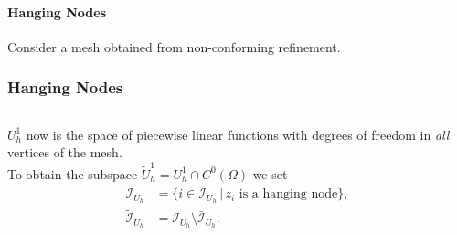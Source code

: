 \paragraph{Hanging Nodes}

Consider a mesh obtained from non-conforming refinement.

\begin{frame}
\frametitle<presentation>{Hanging Nodes}
\begin{columns}
\begin{column}{0.6\textwidth}
$U_h^1$ now is the space of piecewise linear functions with degrees of
freedom in \textit{all} vertices of the mesh. \\
\medskip
To obtain the subspace $\tilde{U}_h^1 = U_h^1 \cap C^0(\Omega)$ we set 
\begin{align*}
\bar{\mathcal{I}}_{U_h} &= \{i\in \mathcal{I}_{U_h} \,|\, \text{$z_i$ is a
hanging node} \}, \\
\tilde{\mathcal{I}}_{U_h} &=  \mathcal{I}_{U_h}\setminus\bar{\mathcal{I}}_{U_h}.
\end{align*}
\end{column}
\end{columns}

\end{frame}
